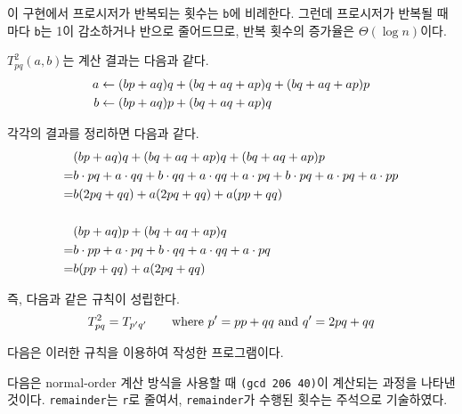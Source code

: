 
이 구현에서 프로시저가 반복되는 횟수는 \texttt{b}에 비례한다. 그런데
프로시저가 반복될 때마다 \texttt{b}는 1이 감소하거나 반으로 줄어드므로, 반복
횟수의 증가율은 $\Theta(\log n)$이다.





$T_{pq}^2(a,b)$는 계산 결과는 다음과 같다.
\begin{align}
  a &\leftarrow (bp+aq)q + (bq+aq+ap)q + (bq+aq+ap)p \notag\\
  b &\leftarrow (bp+aq)p + (bq+aq+ap)q \notag
\end{align}

각각의 결과를 정리하면 다음과 같다.
\begin{align}
    & (bp+aq)q + (bq+aq+ap)q + (bq+aq+ap)p \notag\\
   =& b\cdot pq + a\cdot qq + b\cdot qq + a\cdot qq + a\cdot pq
      + b\cdot pq + a\cdot pq + a\cdot pp \notag\\
   =& b(2pq + qq) + a(2pq + qq) + a(pp+qq) \notag\\
   \notag\\
    & (bp+aq)p + (bq+aq+ap)q \notag\\
   =& b\cdot pp + a\cdot pq + b\cdot qq + a\cdot qq + a\cdot pq \notag\\
   =& b(pp+qq) + a(2pq+qq) \notag
\end{align}

즉, 다음과 같은 규칙이 성립한다.
\begin{equation}\notag
  T_{pq}^2 = T_{p'q'} \qquad \text{where } p'=pp+qq \text{~and~} q'=2pq+qq
\end{equation}

다음은 이러한 규칙을 이용하여 작성한 프로그램이다.


다음은 normal-order 계산 방식을 사용할 때 \texttt{(gcd 206 40)}이 계산되는
과정을 나타낸 것이다. \texttt{remainder}는 \texttt{r}로 줄여서,
\texttt{remainder}가 수행된 횟수는 주석으로 기술하였다.

